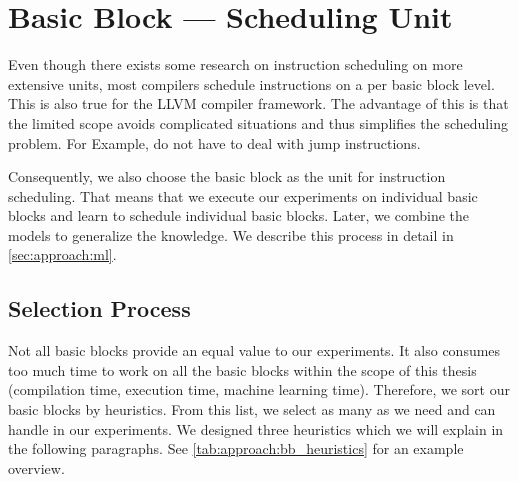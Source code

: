 \section{Basic Block --- Scheduling Unit}
\label{sec:approach:basicblock}
Even though there exists some research  on instruction scheduling on more extensive units, most compilers schedule instructions on a per basic block level.
This is also true for the LLVM compiler framework.
The advantage of this is that the limited scope avoids complicated situations and thus simplifies the scheduling problem.
For Example, do not have to deal with jump instructions.

Consequently, we also choose the basic block as the unit for instruction scheduling.
That means that we execute our experiments on individual basic blocks and learn to schedule individual basic blocks.
Later, we combine the models to generalize the knowledge.
We describe this process in detail in \cref{sec:approach:ml}.

\subsection{Selection Process}
\label{sec:approach:basicblock:selection}
Not all basic blocks provide an equal value to our experiments.
It also consumes too much time to work on all the basic blocks within the scope of this thesis (\eg compilation time, execution time, machine learning time).
Therefore, we sort our basic blocks by heuristics. 
From this list, we select as many as we need and can handle in our experiments.
We designed three heuristics which we will explain in the following paragraphs.
See \cref{tab:approach:bb_heuristics} for an example overview.

